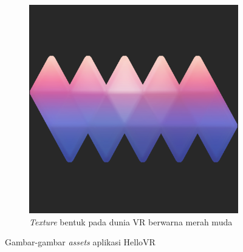 \begin{figure}[]
\begin{subfigure}{.33\textwidth}
  		\label{fig:blue-shape}
	\end{subfigure}
	\begin{subfigure}{.33\textwidth}
  		\centering
  		\includegraphics[width=.8\linewidth]{Gambar/shape_pink.png}
  		\caption{\textit{Texture} bentuk pada dunia VR berwarna merah muda}
  		\label{fig:pink-shape}
	\end{subfigure}
	\caption{Gambar-gambar \textit{assets} aplikasi HelloVR \\}
	\label{fig:hello-vr-assets}
\end{figure}


